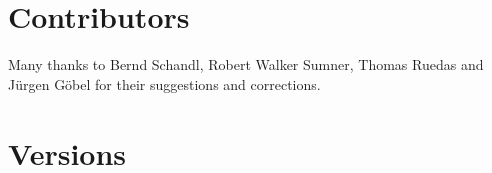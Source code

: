 \documentclass[10pt]{article}
\begin{document}

\section{Contributors}

Many thanks to Bernd Schandl, Robert Walker Sumner, Thomas Ruedas and
J\"urgen G\"obel for their suggestions and corrections.

\section{Versions}
\end{document}
